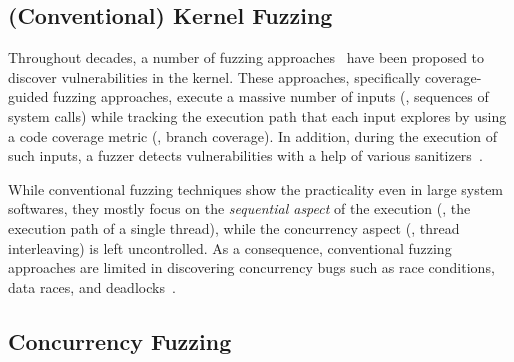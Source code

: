 
\subsection{(Conventional) Kernel Fuzzing}
\label{ss:kernelfuzzing}

Throughout decades, a number of fuzzing approaches~\cite{imf,
  syzkaller, moonshine, hfl, healer, janus, hydra, trinity} have been
proposed to discover vulnerabilities in the kernel.
%
These approaches, specifically coverage-guided fuzzing approaches,
execute a massive number of inputs (\ie, sequences of system calls)
while tracking the execution path that each input explores by using a
code coverage metric (\eg, branch coverage).
%
In addition, during the execution of such inputs, a fuzzer detects
vulnerabilities with a help of various sanitizers~\cite{meds, kasan,
  asan, ubsan, lockdep}.


While conventional fuzzing techniques show the practicality even in
large system softwares, they mostly focus on the \textit{sequential
  aspect} of the execution (\ie, the execution path of a single
thread), while the concurrency aspect (\ie, thread interleaving) is
left uncontrolled.
%
%
As a consequence, conventional fuzzing approaches are limited in
discovering concurrency bugs such as race conditions, data races, and
deadlocks~\cite{covcon, terragni2018effectiveness}.





\subsection{Concurrency Fuzzing}
\label{ss:concurrencyfuzzing}





